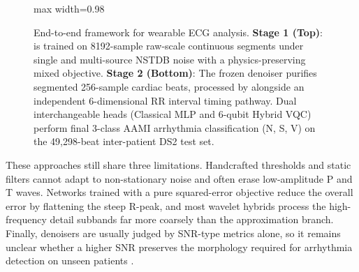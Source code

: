 \begin{figure}[!t]
\begin{adjustbox}{max width=0.98\textwidth}
\end{adjustbox}
\caption{End-to-end framework for wearable ECG analysis. \textbf{Stage 1 (Top)}: \HSL{} is trained on 8192-sample raw-scale continuous segments under single and multi-source NSTDB noise with a physics-preserving mixed objective. \textbf{Stage 2 (Bottom)}: The frozen denoiser purifies segmented 256-sample cardiac beats, processed by \RRN{} alongside an independent 6-dimensional RR interval timing pathway. Dual interchangeable heads (Classical MLP and 6-qubit Hybrid VQC) perform final 3-class AAMI arrhythmia classification (N, S, V) on the 49{,}298-beat inter-patient DS2 test set.}
\label{fig:pipeline}
\end{figure}

These approaches still share three limitations. Handcrafted thresholds and static filters cannot adapt to non-stationary noise and often erase low-amplitude P and T waves. Networks trained with a pure squared-error objective reduce the overall error by flattening the steep R-peak, and most wavelet hybrids process the high-frequency detail subbands far more coarsely than the approximation branch. Finally, denoisers are usually judged by SNR-type metrics alone, so it remains unclear whether a higher SNR preserves the morphology required for arrhythmia detection on unseen patients \cite{dechazal2004}.

